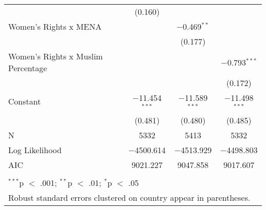 \begin{table}[!htbp]
\begin{tabular}{@{\extracolsep{5pt}}lccc}
  & (0.160) &  &  \\ 
  Women's Rights x MENA &  & $-$0.469$^{**}$ &  \\ 
  &  & (0.177) &  \\ 
  Women's Rights x Muslim Percentage &  &  & $-$0.793$^{***}$ \\ 
  &  &  & (0.172) \\ 
  Constant & $-$11.454$^{***}$ & $-$11.589$^{***}$ & $-$11.498$^{***}$ \\ 
  & (0.481) & (0.480) & (0.485) \\ 
 N & 5332 & 5413 & 5332 \\ 
Log Likelihood & $-$4500.614 & $-$4513.929 & $-$4498.803 \\ 
AIC & 9021.227 & 9047.858 & 9017.607 \\ 
\hline \\[-1.8ex] 
\multicolumn{4}{l}{$^{***}$p $<$ .001; $^{**}$p $<$ .01; $^{*}$p $<$ .05} \\ 
\multicolumn{4}{l}{Robust standard errors clustered on country appear in parentheses.} \\ 
\end{tabular} 
\end{table} 
